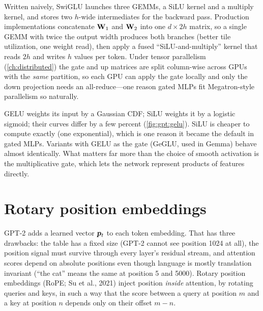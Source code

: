 \begin{systemslens}
Written naively, SwiGLU launches three GEMMs, a SiLU kernel and a multiply kernel, and stores two
$h$-wide intermediates for the backward pass. Production implementations concatenate $\mathbf{W}_1$ and
$\mathbf{W}_2$ into one $d\times 2h$ matrix, so a single GEMM with twice the output width produces both
branches (better tile utilization, one weight read), then apply a fused ``SiLU-and-multiply'' kernel
that reads $2h$ and writes $h$ values per token. Under tensor parallelism (\cref{ch:distributed}) the
gate and up matrices are split column-wise across GPUs with the \emph{same} partition, so each GPU
can apply the gate locally and only the down projection needs an all-reduce---one reason gated MLPs
fit Megatron-style parallelism so naturally.
\end{systemslens}

\begin{deepdive}
GELU weights its input by a Gaussian CDF; SiLU weights it by a logistic sigmoid; their curves differ by
a few percent (\cref{fig:gpt:gelu}). SiLU is cheaper to compute exactly (one exponential), which is one
reason it became the default in gated MLPs. Variants with GELU as the gate (GeGLU, used in Gemma) behave
almost identically. What matters far more than the choice of smooth activation is the multiplicative
gate, which lets the network represent products of features directly.
\end{deepdive}

\section{Rotary position embeddings}\label{sec:modern:rope}

GPT-2 adds a learned vector $\bm{p}_t$ to each token embedding. That has three drawbacks: the table
has a fixed size (GPT-2 cannot see position 1024 at all), the position signal must survive through
every layer's residual stream, and attention scores depend on absolute positions even though language
is mostly translation invariant (``the cat'' means the same at position 5 and 5000). Rotary position
embeddings (RoPE; Su et al., 2021) inject position \emph{inside} attention, by rotating queries and
keys, in such a way that the score between a query at position $m$ and a key at position $n$ depends
only on their offset $m-n$.

